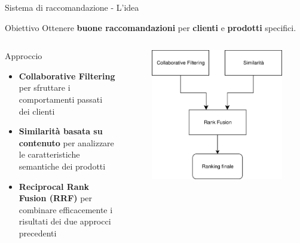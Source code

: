 \documentclass{beamer}
\begin{document}
	\begin{frame}{Sistema di raccomandazione - L'idea}
        \begin{alertblock}{Obiettivo}
			Ottenere \textbf{buone raccomandazioni} per \textbf{clienti} e \textbf{prodotti} specifici.
		\end{alertblock}

		\begin{columns}
			\begin{column}{0.6\textwidth}
				\begin{exampleblock}{Approccio}
					\begin{itemize}
						\item \textbf{Collaborative Filtering} per sfruttare i comportamenti passati dei clienti
						\item \textbf{Similarità basata su contenuto} per analizzare le caratteristiche semantiche dei prodotti
						\item \textbf{Reciprocal Rank Fusion (RRF)} per combinare efficacemente i risultati dei due approcci precedenti
					\end{itemize}
				\end{exampleblock}
			\end{column}
			\begin{column}{0.4\textwidth}
				\begin{figure}
					\centering
					\includegraphics[width=\textwidth]{Diagramma pipeline sistema di raccomandazione.png}
				\end{figure}
			\end{column}
		\end{columns}
	\end{frame}
\end{document}
